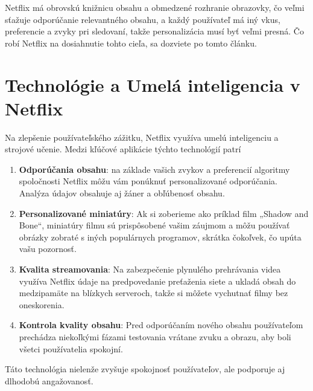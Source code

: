 \documentclass[10pt,slovak,a4paper]{article}
\begin{document}
Netflix má obrovskú knižnicu obsahu a obmedzené rozhranie obrazovky, čo veľmi sťažuje odporúčanie relevantného obsahu, a každý používateľ má iný vkus, preferencie a zvyky pri sledovaní, takže personalizácia musí byť veľmi presná.
Čo robí Netflix na dosiahnutie tohto cieľa, sa dozviete po tomto článku.

\section{Technológie a Umelá inteligencia v Netflix}
Na zlepšenie používateľského zážitku, Netflix využíva umelú inteligenciu a strojové učenie. Medzi kľúčové aplikácie týchto technológií patrí\cite{AI}

\begin{enumerate}
    \item \textbf{Odporúčania obsahu}: na základe vašich zvykov a preferencií algoritmy spoločnosti Netflix môžu vám ponúknuť personalizované odporúčania. Analýza údajov obsahuje aj žáner a obľúbenosť obsahu.\cite{Odp:alg:sys}
    
    \item \textbf{Personalizované miniatúry}: Ak si zoberieme ako príklad film „Shadow and Bone“, miniatúry filmu sú prispôsobené vašim záujmom a môžu používať obrázky zobraté s iných populárnych programov, skrátka čokoľvek, čo upúta vašu pozornosť.\cite{AI_deep:lerning}
    
    \item \textbf{Kvalita streamovania}: Na zabezpečenie plynulého prehrávania videa využíva Netflix údaje na predpovedanie preťaženia siete a ukladá obsah do medzipamäte na blízkych serveroch, takže si môžete vychutnať filmy bez oneskorenia.\cite{AI_deep:lerning}
    
    \item \textbf{Kontrola kvality obsahu}: Pred odporúčaním nového obsahu používateľom prechádza niekoľkými fázami testovania vrátane zvuku a obrazu, aby boli všetci používatelia spokojní.\cite{AI_deep:lerning}
    
\end{enumerate}

Táto technológia nielenže zvyšuje spokojnosť používateľov, ale podporuje aj dlhodobú angažovanosť.
\end{document}
